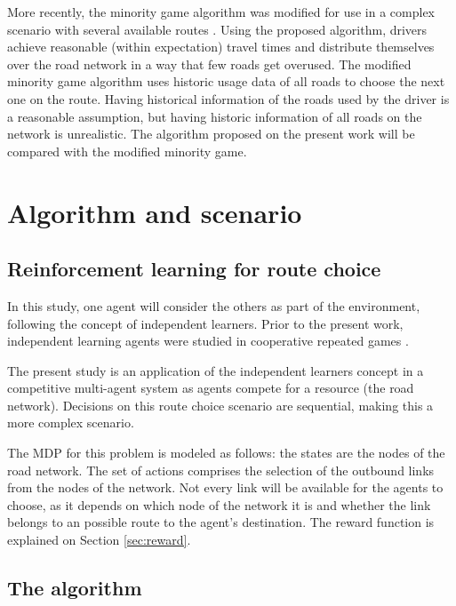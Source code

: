 \documentclass[12pt]{article}
\begin{document}
More recently, the minority game algorithm was modified for use in a complex scenario with several available routes \cite{Galib&Moser2011}. Using the proposed algorithm, drivers achieve reasonable (within expectation) travel times and distribute themselves over the road network in a way that few roads get overused. The modified minority game algorithm uses historic usage data of all roads to choose the next one on the route. Having historical information of the roads used by the driver is a reasonable assumption, but having historic information of all roads on the network is unrealistic. The algorithm proposed on the present work will be compared with the modified minority game. 

\section{Algorithm and scenario}
\label{sec:proposal}

\subsection{Reinforcement learning for route choice}

In this study, one agent will consider the others as part of the environment, following the concept of independent learners. Prior to the present work, independent learning agents were studied in cooperative repeated games \cite{Claus&Boutilier1998, Tan1993, Sen+1994}.

The present study is an application of the independent learners concept in a competitive multi-agent system as agents compete for a resource (the road network). Decisions on this route choice scenario are sequential, making this a more complex scenario. %

The MDP for this problem is modeled as follows: the states are the nodes of the road network. The set of actions comprises the selection of the outbound links from the nodes of the network. Not every link will be available for the agents to choose, as it depends on which node of the network it is and whether the link belongs to an possible route to the agent's destination. The reward function is explained on Section \ref{sec:reward}. %

\subsection{The algorithm}
\end{document}

